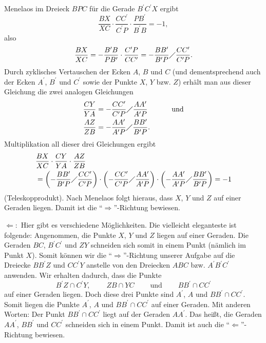 \documentclass[12pt,final,notitlepage,onecolumn,german]{article}%
\theoremstyle{definition}
\theoremstyle{plainsl}
\begin{document}
Menelaos im Dreieck $BPC$ f\"{u}r die Gerade $B^{\prime}C^{\prime}X$ ergibt%
\[
\dfrac{BX}{XC}\cdot\dfrac{CC^{\prime}}{C^{\prime}P}\cdot\dfrac{PB^{\prime}%
}{B^{\prime}B}=-1,
\]
also%
\[
\dfrac{BX}{XC}=-\dfrac{B^{\prime}B}{PB^{\prime}}\cdot\dfrac{C^{\prime}%
P}{CC^{\prime}}=-\dfrac{BB^{\prime}}{B^{\prime}P}\diagup\dfrac{CC^{\prime}%
}{C^{\prime}P}.
\]
Durch zyklisches Vertauschen der Ecken $A$, $B$ und $C$ (und dementsprechend
auch der Ecken $A^{\prime}$, $B^{\prime}$ und $C^{\prime}$ sowie der Punkte
$X$, $Y$ bzw. $Z$) erh\"{a}lt man aus dieser Gleichung die zwei analogen
Gleichungen%
\begin{align*}
\dfrac{CY}{YA}  &  =-\dfrac{CC^{\prime}}{C^{\prime}P}\diagup\dfrac{AA^{\prime
}}{A^{\prime}P}\ \ \ \ \ \ \ \ \ \ \text{und}\\
\dfrac{AZ}{ZB}  &  =-\dfrac{AA^{\prime}}{A^{\prime}P}\diagup\dfrac{BB^{\prime
}}{B^{\prime}P}.
\end{align*}
Multiplikation all dieser drei Gleichungen ergibt%
\begin{align*}
&  \dfrac{BX}{XC}\cdot\dfrac{CY}{YA}\cdot\dfrac{AZ}{ZB}\\
&  =\left(  -\dfrac{BB^{\prime}}{B^{\prime}P}\diagup\dfrac{CC^{\prime}%
}{C^{\prime}P}\right)  \cdot\left(  -\dfrac{CC^{\prime}}{C^{\prime}P}%
\diagup\dfrac{AA^{\prime}}{A^{\prime}P}\right)  \cdot\left(  -\dfrac
{AA^{\prime}}{A^{\prime}P}\diagup\dfrac{BB^{\prime}}{B^{\prime}P}\right)  =-1
\end{align*}
(Teleskopprodukt). Nach Menelaos folgt hieraus, dass $X$, $Y$ und $Z$ auf
einer Geraden liegen. Damit ist die \textquotedblleft$\Longrightarrow
$\textquotedblright-Richtung bewiesen.

$\Longleftarrow:$ Hier gibt es verschiedene M\"{o}glichkeiten. Die vielleicht
eleganteste ist folgende: Angenommen, die Punkte $X$, $Y$ und $Z$ liegen auf
einer Geraden. Die Geraden $BC$, $B^{\prime}C^{\prime}$ und $ZY$ schneiden
sich somit in einem Punkt (n\"{a}mlich im Punkt $X$). Somit k\"{o}nnen wir die
\textquotedblleft$\Longrightarrow$\textquotedblright-Richtung unserer Aufgabe
auf die Dreiecke $BB^{\prime}Z$ und $CC^{\prime}Y$ anstelle von den Dreiecken
$ABC$ bzw. $A^{\prime}B^{\prime}C^{\prime}$ anwenden. Wir erhalten dadurch,
dass die Punkte%
\[
B^{\prime}Z\cap C^{\prime}Y,\ \ \ \ \ \ \ \ \ \ ZB\cap
YC\ \ \ \ \ \ \ \ \ \ \text{und}\ \ \ \ \ \ \ \ \ \ BB^{\prime}\cap
CC^{\prime}%
\]
auf einer Geraden liegen. Doch diese drei Punkte sind $A^{\prime}$, $A$ und
$BB^{\prime}\cap CC^{\prime}$. Somit liegen die Punkte $A^{\prime}$, $A$ und
$BB^{\prime}\cap CC^{\prime}$ auf einer Geraden. Mit anderen Worten: Der Punkt
$BB^{\prime}\cap CC^{\prime}$ liegt auf der Geraden $AA^{\prime}$. Das
hei\ss t, die Geraden $AA^{\prime}$, $BB^{\prime}$ und $CC^{\prime}$ schneiden
sich in einem Punkt. Damit ist auch die \textquotedblleft$\Longleftarrow
$\textquotedblright-Richtung bewiesen.
\end{document}
